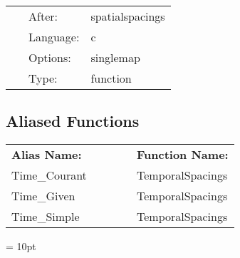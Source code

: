 \documentclass{article}
\begin{document}
 \begin{tabular*}{160mm}{cll} 
~ & After:  & spatialspacings \\ 
~ & Language:  & c \\ 
~ & Options:  & singlemap \\ 
~ & Type:  & function \\ 
\end{tabular*} 


\subsection*{Aliased Functions}

\hspace{5mm}

 \begin{tabular*}{160mm}{ll} 

{\bf Alias Name:} ~~~~~~~ & {\bf Function Name:} \\ 
Time\_Courant & TemporalSpacings \\ 
Time\_Given & TemporalSpacings \\ 
Time\_Simple & TemporalSpacings \\ 
\end{tabular*} 



\vspace{5mm}\parskip = 10pt 
\end{document}

